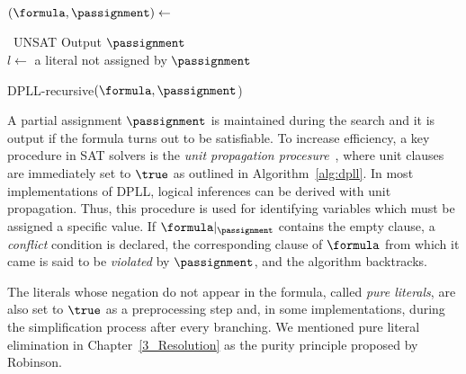 \begin{algorithm}[htp]%
    \SetAlgoLined\DontPrintSemicolon%
    $(\formula, \passignment) \leftarrow$ \proc{$\formula,\passignment$}

    {\Return~UNSAT}
    {Output $\passignment$\\
    }
    $l \leftarrow$ a literal not assigned by $\passignment$

    {}

    \vspace{2mm}
    \setcounter{AlgoLine}{0}
    \caption{DPLL-recursive$(\formula, \passignment$)}%
    \label{alg:dpll}
\end{algorithm} 

A partial assignment $\passignment$ is maintained during the search and it is
output if the formula turns out to be satisfiable.  To increase efficiency, a
key procedure in SAT solvers is the \emph{unit propagation
procesure}~\cite{cdclchapter}, where unit clauses are immediately set to $\true$
as outlined in Algorithm~\ref{alg:dpll}. In most implementations of DPLL,
logical inferences can be derived with unit propagation.  Thus, this procedure
is used for identifying variables which must be assigned a specific value. If
$\formula |_\passignment$ contains the empty clause, a \emph{conflict} condition
is declared, the corresponding clause of $\formula$ from which it came is said
to be \emph{violated} by $\passignment$, and the algorithm backtracks. 

The literals whose negation do not appear in the formula, called
\emph{pure literals}, are also set to $\true$ as a preprocessing step and, in
some implementations, during the simplification process after every branching. 
We mentioned pure literal elimination in Chapter~\ref{3_Resolution} as the
purity principle proposed by Robinson.

